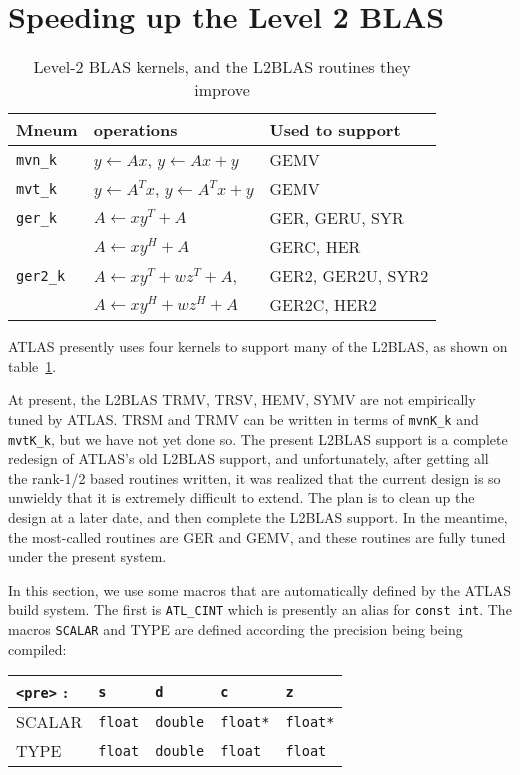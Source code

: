\documentclass[11pt]{article}
\newcommand{\kernk}[1]{{\tt #1\_k}}
\begin{document}
\section{Speeding up the Level 2 BLAS}
\begin{table}[thb]
\begin{center}
\begin{tabular}{lll}
Mneum & operations & Used to support \\\hline\hline
\kernk{mvn} & $y \leftarrow Ax$, $y \leftarrow Ax + y$ & GEMV\\\hline
\kernk{mvt} & $y \leftarrow A^Tx$, $y \leftarrow A^Tx + y$ & GEMV\\\hline
\kernk{ger} & $A \leftarrow xy^T + A$  & GER, GERU, SYR \\
            & $A \leftarrow xy^H + A$  & GERC, HER\\\hline
\kernk{ger2}& $A \leftarrow xy^T + wz^T + A$, & GER2, GER2U, SYR2 \\
            & $A \leftarrow xy^H + wz^H + A$ & GER2C, HER2 \\\hline
\end{tabular}
\end{center}
\caption{Level-2 BLAS kernels, and the L2BLAS routines they improve}
\label{tab-l2k}
\end{table}
ATLAS presently uses four kernels to support many of the L2BLAS, as shown
on table~\ref{tab-l2k}.  

At present, the L2BLAS TRMV, TRSV, HEMV, SYMV are not empirically tuned
by ATLAS.  TRSM and TRMV can be written in terms of \kernk{mvnK} and 
\kernk{mvtK}, but we have not yet done so.  The present L2BLAS support
is a complete redesign of ATLAS's old L2BLAS support, and unfortunately,
after getting all the rank-1/2 based routines written, it was realized
that the current design is so unwieldy that it is extremely difficult to
extend.  The plan is to clean up the design at a later date, and then
complete the L2BLAS support.  In the meantime, the most-called routines
are GER and GEMV, and these routines are fully tuned under the present
system.

In this section, we use some macros that are automatically defined
by the ATLAS build system.  The first is {\tt ATL\_CINT} which is
presently an alias for {\tt const int}.  The macros {\tt SCALAR}
and {TYPE} are defined according the precision being being compiled:
\begin{tabular}{||l|l|l|l|l||}\hline\hline
\verb+<pre>+ : & {\tt s} & {\tt d} & {\tt c} & {\tt z} \\\hline\hline
SCALAR & {\tt float} & {\tt double} & {\tt float*} & {\tt float*} \\\hline
TYPE   & {\tt float} & {\tt double} & {\tt float} & {\tt float} \\\hline\hline
\end{tabular}
\end{document}
